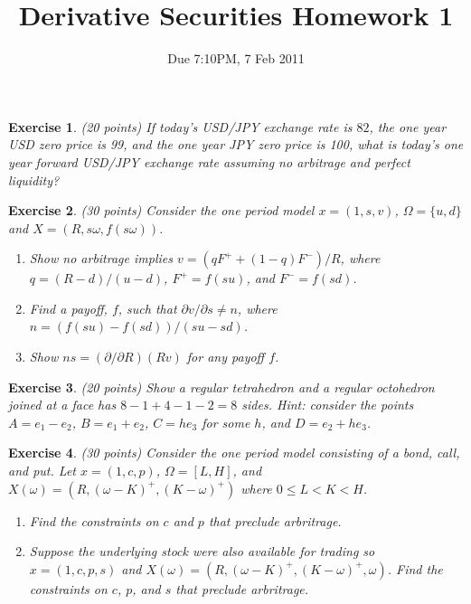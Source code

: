 \documentclass[11pt,fleqn]{amsproc}
\newtheorem{xca}{Exercise}
\begin{document}
\title{Derivative Securities Homework 1}
\author{Due 7:10PM, 7 Feb 2011}

\maketitle

\begin{xca}{(20 points)}
If today's USD/JPY exchange rate is $82$, the one year USD zero price is 99,
and the one year JPY zero price is 100, what is today's one year forward 
USD/JPY exchange rate assuming no arbitrage and perfect liquidity?
\end{xca}

\begin{xca}{(30 points)}
Consider the one period model $x = (1, s, v)$,
$\Omega = \{u, d\}$ and $X = (R, s\omega, f(s\omega))$.
\begin{enumerate}
\item Show no arbitrage implies $v = (qF^+ + (1 - q)F^-)/R$, where
$q = (R - d)/(u - d)$, $F^+ = f(su)$, and $F^- = f(sd)$.
\item Find a payoff, $f$, such that $\partial v/\partial s \not= n$, where
$n = (f (su) - f (sd))/(su - sd)$.
\item Show $ns = (\partial/\partial R)(Rv)$ for any payoff $f$.
\end{enumerate}
\end{xca}

\begin{xca}{(20 points)}
Show a regular tetrahedron and a regular octohedron joined at a face
has $8 - 1 + 4 - 1 - 2 = 8$ sides. Hint: consider the points
$A = e_1 - e_2$, $B = e_1 + e_2$, $C = h e_3$ for some $h$, and
$D = e_2 + h e_3$.
\end{xca}

\begin{xca}{(30 points)}
Consider the one period model consisting of a bond, call, and
put. Let $x = (1, c, p)$, $\Omega = [L,H]$, and
$X(\omega) = (R, (\omega - K)^+, (K - \omega)^+)$ where
$0\le L < K < H$.

\begin{enumerate}

\item Find the constraints on $c$ and $p$
that preclude arbritrage.

\item Suppose the underlying stock were also available
for trading so $x = (1, c, p, s)$ and
$X(\omega) = (R, (\omega - K)^+, (K - \omega)^+, \omega)$.
Find the constraints on $c$, $p$, and $s$
that preclude arbritrage.

\end{enumerate}
\end{xca}
\end{document}
